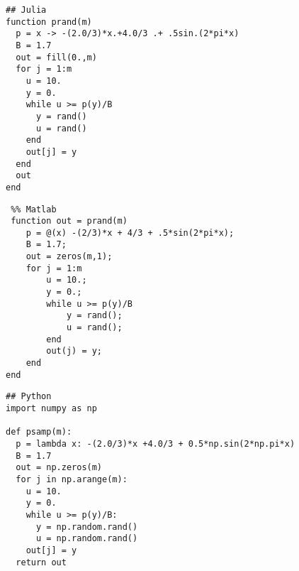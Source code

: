 \documentclass[10pt]{amsart}
\begin{document}
  \mline
\begin{lstlisting}
## Julia
function prand(m)
  p = x -> -(2.0/3)*x.+4.0/3 .+ .5sin.(2*pi*x)
  B = 1.7
  out = fill(0.,m)
  for j = 1:m
    u = 10.
    y = 0.
    while u >= p(y)/B
      y = rand()
      u = rand()
    end
    out[j] = y
  end
  out     
end
  \end{lstlisting}
    \begin{lstlisting}
 %% Matlab
 function out = prand(m) 
    p = @(x) -(2/3)*x + 4/3 + .5*sin(2*pi*x);
    B = 1.7;
    out = zeros(m,1);
    for j = 1:m
        u = 10.;
        y = 0.;
        while u >= p(y)/B
            y = rand();
            u = rand();
        end
        out(j) = y;
    end     
end
  \end{lstlisting}
  \begin{lstlisting}
## Python
import numpy as np
    
def psamp(m):
  p = lambda x: -(2.0/3)*x +4.0/3 + 0.5*np.sin(2*np.pi*x)
  B = 1.7
  out = np.zeros(m)
  for j in np.arange(m):
    u = 10.
    y = 0.
    while u >= p(y)/B:
      y = np.random.rand()
      u = np.random.rand()
    out[j] = y
  return out
\end{lstlisting}

  
\end{document}
